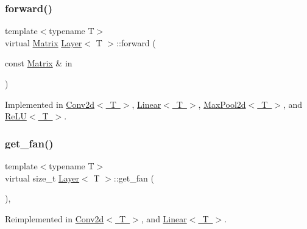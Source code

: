 \mbox{\label{class_layer_ab15b665c86974b1cf1d7ba4e309cb0e5}} 
\subsubsection{\texorpdfstring{forward()}{forward()}}
{\footnotesize\ttfamily template$<$typename T$>$ \\
virtual \mbox{\hyperlink{class_layer_a22b1e7286096aa62bd245536c8ebdaf1}{Matrix}} \mbox{\hyperlink{class_layer}{Layer}}$<$ T $>$\+::forward (\begin{DoxyParamCaption}\item[{const \mbox{\hyperlink{class_layer_a22b1e7286096aa62bd245536c8ebdaf1}{Matrix}} \&}]{in }\end{DoxyParamCaption})\hspace{0.3cm}{\ttfamily [pure virtual]}}



Implemented in \mbox{\hyperlink{class_conv2d_ab795f6a1cabcfedfb2fcb55c9389c2fe}{Conv2d$<$ T $>$}}, \mbox{\hyperlink{class_linear_a901668e9219a8d446b2ac60718b9c9f1}{Linear$<$ T $>$}}, \mbox{\hyperlink{class_max_pool2d_a424de7878c64a058a8549362dae448f0}{Max\+Pool2d$<$ T $>$}}, and \mbox{\hyperlink{class_re_l_u_aef903f5e7d309e76f49abc34043354ce}{Re\+L\+U$<$ T $>$}}.

\mbox{\label{class_layer_a43681206a2ef690667c41423b6b6f20b}} 
\subsubsection{\texorpdfstring{get\_fan()}{get\_fan()}}
{\footnotesize\ttfamily template$<$typename T$>$ \\
virtual size\+\_\+t \mbox{\hyperlink{class_layer}{Layer}}$<$ T $>$\+::get\+\_\+fan (\begin{DoxyParamCaption}{ }\end{DoxyParamCaption})\hspace{0.3cm}{\ttfamily [inline]}, {\ttfamily [virtual]}}



Reimplemented in \mbox{\hyperlink{class_conv2d_a6eeedff6c4d0864a4c3788e06e82a2e4}{Conv2d$<$ T $>$}}, and \mbox{\hyperlink{class_linear_a753a7cb02a0b18e8922d23db905eb534}{Linear$<$ T $>$}}.

